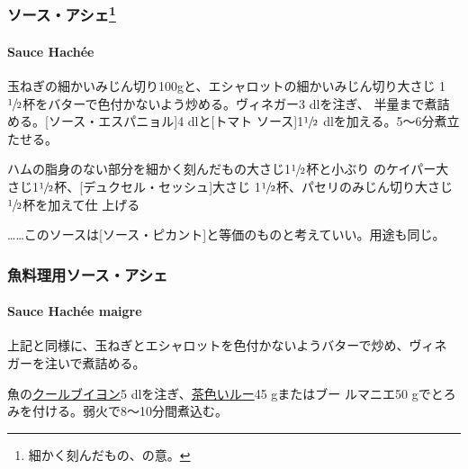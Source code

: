 \maeaki

\hypertarget{ux30bdux30fcux30b9ux30a2ux30b7ux30a743}{%
\subsubsection[ソース・アシェ]{\texorpdfstring{ソース・アシェ\footnote{細かく刻んだもの、の意。}}{ソース・アシェ}}\label{ux30bdux30fcux30b9ux30a2ux30b7ux30a743}}

\hypertarget{sauce-hachee}{%
\paragraph{Sauce Hachée}\label{sauce-hachee}}


玉ねぎの細かいみじん切り100gと、エシャロットの細かいみじん切り大さじ
1\(\sfrac{1}{2}\)杯をバターで色付かないよう炒める。ヴィネガー3
dlを注ぎ、 半量まで煮詰める。{[}ソース・エスパニョル{]}4 dlと{[}トマト
ソース{]}1\(\sfrac{1}{2}\) dlを加える。5〜6分煮立たせる。

ハムの脂身のない部分を細かく刻んだもの大さじ1\(\sfrac{1}{2}\)杯と小ぶり
のケイパー大さじ1\(\sfrac{1}{2}\)杯、{[}デュクセル・セッシュ{]}大さじ
1\(\sfrac{1}{2}\)杯、パセリのみじん切り大さじ\(\sfrac{1}{2}\)杯を加えて仕
上げる

\ldots{}\ldots{}このソースは{[}ソース・ピカント{]}と等価のものと考えていい。用途も同じ。

\maeaki

\hypertarget{ux9b5aux6599ux7406ux7528ux30bdux30fcux30b9ux30a2ux30b7ux30a7}{%
\subsubsection{魚料理用ソース・アシェ}\label{ux9b5aux6599ux7406ux7528ux30bdux30fcux30b9ux30a2ux30b7ux30a7}}

\hypertarget{sauce-hachee-maigre}{%
\paragraph{Sauce Hachée maigre}\label{sauce-hachee-maigre}}

上記と同様に、玉ねぎとエシャロットを色付かないようバターで炒め、ヴィネ
ガーを注いで煮詰める。

魚の\href{}{クールブイヨン}5
dlを注ぎ、\protect\hyperlink{roux-brun}{茶色いルー}45 gまたはブー
ルマニエ50 gでとろみを付ける。弱火で8〜10分間煮込む。

